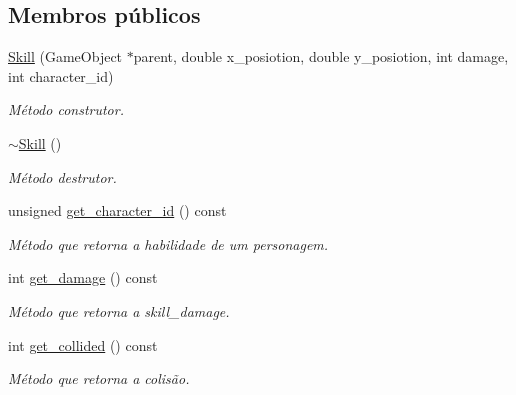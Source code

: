 \subsection*{Membros públicos}
\begin{DoxyCompactItemize}
\item 
\mbox{\hyperlink{classSkill_a179f277e58924d53051eae66896b3a74}{Skill}} (Game\+Object $\ast$parent, double x\+\_\+posiotion, double y\+\_\+posiotion, int damage, int character\+\_\+id)
\begin{DoxyCompactList}\small\item\em Método construtor. \end{DoxyCompactList}\item 
\mbox{\label{classSkill_a6525c1f0b7299ff447ee14f36b55967a}} 
\mbox{\hyperlink{classSkill_a6525c1f0b7299ff447ee14f36b55967a}{$\sim$\+Skill}} ()
\begin{DoxyCompactList}\small\item\em Método destrutor. \end{DoxyCompactList}\item 
\mbox{\label{classSkill_a69293c2a9324f011147d444aee01e319}} 
unsigned \mbox{\hyperlink{classSkill_a69293c2a9324f011147d444aee01e319}{get\+\_\+character\+\_\+id}} () const
\begin{DoxyCompactList}\small\item\em Método que retorna a habilidade de um personagem. \end{DoxyCompactList}\item 
\mbox{\label{classSkill_ae24133703ea9307d93ea305115dc0175}} 
int \mbox{\hyperlink{classSkill_ae24133703ea9307d93ea305115dc0175}{get\+\_\+damage}} () const
\begin{DoxyCompactList}\small\item\em Método que retorna a skill\+\_\+damage. \end{DoxyCompactList}\item 
\mbox{\label{classSkill_a43a9dd5e3862f3698fe1b92724a6ab72}} 
int \mbox{\hyperlink{classSkill_a43a9dd5e3862f3698fe1b92724a6ab72}{get\+\_\+collided}} () const
\begin{DoxyCompactList}\small\item\em Método que retorna a colisão. \end{DoxyCompactList}\item 

\end{DoxyCompactItemize}
